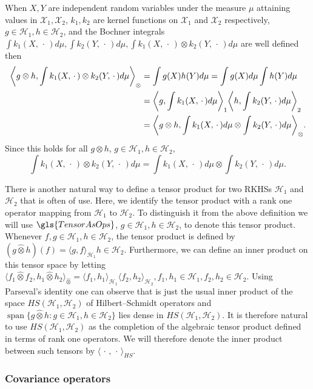 \documentclass[AHL,Unicode,longabstracts,published]{cedram}
\theoremstyle{remark}
\DeclareMathOperator{\spn}{span}
\newcommand{\X}{\mathcal{X}}
\newcommand{\cH}{\mathcal{H}}
\let\originalleft\left
\let\originalright\right
\renewcommand{\left}{\mathopen{}\mathclose\bgroup\originalleft}
\renewcommand{\right}{\aftergroup\egroup\originalright}
\begin{document}
When $X,Y$ are independent random variables under the measure $\mu$ attaining values in $\X_1, \X_2$, $k_1,k_2$ are kernel functions on $\X_1$ and $\X_2$ respectively, $g\in \cH_1, h \in \cH_2$, and the Bochner integrals $\int k_1(X,\,\cdot\,) d\mu, \int k_2(Y,\,\cdot\,) d\mu, \int k_1(X,\,\cdot\,) \otimes k_2(Y,\,\cdot\,) d\mu$ are well defined then
\begin{align*}
\left\langle g\otimes h, \int k_1(X,\,\cdot\,) \otimes k_2(Y,\,\cdot\,) d\mu \right\rangle_\otimes
&= \int g(X) h(Y)  d\mu = \int g(X)d\mu \int h(Y)  d\mu\\
&= \left\langle g, \int k_1(X,\,\cdot\,) d\mu \right\rangle_1 \left\langle h, \int k_2(Y,\,\cdot\,) d\mu \right\rangle_2\\
&= \left\langle g \otimes h, \int k_1(X,\,\cdot\,) d\mu \otimes \int k_2(Y,\,\cdot\,) d\mu \right\rangle_\otimes.
\end{align*}
Since this holds for all $g\otimes h$, $g\in \cH_1, h \in \cH_2$,
\begin{equation}\label{eq:tensor_ind}
\int k_1(X,\,\cdot\,) \otimes k_2(Y,\,\cdot\,) d\mu = \int k_1(X,\,\cdot\,) d\mu \otimes \int k_2(Y,\,\cdot\,) d\mu.
\end{equation}

There is another natural way to define a tensor product for two RKHSs $\cH_1$ and $\cH_2$ that is often of use. Here, we identify the tensor product with a rank one operator mapping from $\cH_1$ to $\cH_2$. To distinguish it from the above definition we will use $\gls{TensorAsOps}$, $g\in \cH_1, h\in \cH_2$, to denote this tensor product. Whenever $f,g \in \cH_1, h\in \cH_2$, the tensor product is defined by $(g \widehat \otimes h)(f) = \langle g,f \rangle_{\cH_1} h \in \cH_2$. Furthermore, we can define an inner product on this tensor space by letting $\langle f_1 \widehat \otimes f_2, h_1 \widehat \otimes h_2 \rangle_{\widehat \otimes} = \langle f_1, h_1 \rangle_{\cH_1} \langle f_2,h_2 \rangle_{\cH_2}, f_1,h_1 \in \cH_1, f_2,h_2 \in \cH_2$. Using Parseval's identity one can observe that is just the usual inner product of the space $HS(\cH_1,\cH_2)$ of Hilbert--Schmidt operators and $\spn \{g\widehat \otimes h: g \in \cH_1,h \in \cH_2 \}$ lies dense in $HS(\cH_1,\cH_2)$. It is therefore natural to use $HS(\cH_1,\cH_2)$ as the completion of the algebraic tensor product defined in terms of rank one operators. We will therefore denote the inner product between such tensors by $\langle \,\cdot\,,\,\cdot\,\rangle_{HS}$.


\subsubsection{Covariance operators}
\end{document}
